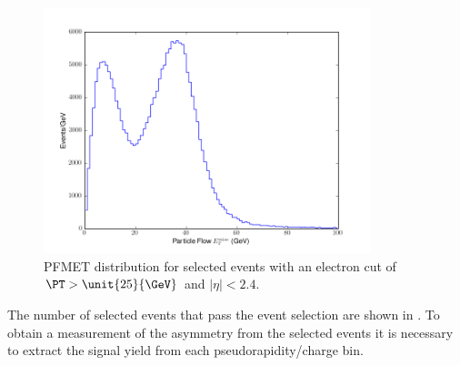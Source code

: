\begin{figure}[htbp]
  \begin{center}
    \includegraphics*[width=0.85\textwidth]{pfmet_dist}
    \caption{{PFMET} distribution for selected events with an electron cut of
$\PT > \unit{25}{\GeV}$ and $|\eta| <
2.4$\cite{baisini2010electron}.\label{fig:pfmet_dist_36}}
  \end{center}
\end{figure}

The number of selected events that pass the
event selection are shown in . To obtain a
measurement of the asymmetry from the selected events it is necessary to extract
the signal yield from each pseudorapidity/charge bin.

